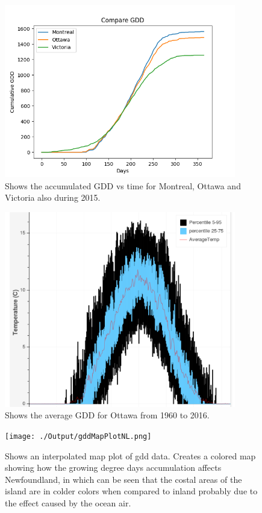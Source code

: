 \documentclass[12pt]{article}
\begin{document}
	\begin{figure}[!htbp]
		\centering
		\includegraphics[width=0.9\textwidth]{./Output/CumulativeGDD.png} 
		\caption{\scriptsize Shows the accumulated GDD vs time for Montreal, Ottawa and Victoria also
		during 2015.}\label{GDDplot}		  
	\end{figure}

	\begin{figure}[!htbp]
		\centering
		\includegraphics[width=0.9\textwidth]{./Report/GDDstats.png} 
		\caption{\scriptsize Shows the average GDD for Ottawa from 1960 to 2016.}\label{GDDstats}		  
	\end{figure}


	\begin{figure}[!htbp]
		\centering
		\texttt{[image: ./Output/gddMapPlotNL.png]} 
		\caption{\scriptsize Shows an interpolated map plot of gdd data.
		Creates a colored map showing how the growing degree days accumulation affects Newfoundland, 
		in which can be seen that the costal areas of the island are in colder colors when compared to
		inland probably due to the effect caused by the ocean air.
		}\label{gddMapNl}		  
	\end{figure}
\end{document}
